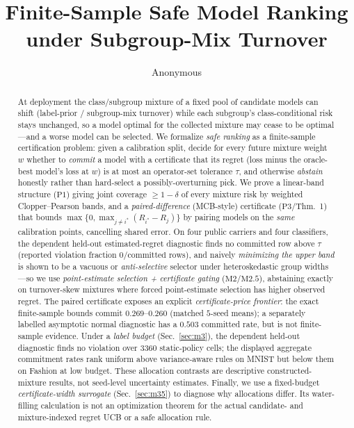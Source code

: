 \documentclass{article}
\title{Finite-Sample Safe Model Ranking under Subgroup-Mix Turnover}
\author{Anonymous}
\date{}
\begin{document}
\maketitle

\begin{abstract}
At deployment the class/subgroup mixture of a fixed pool of candidate models can shift
(label-prior / subgroup-mix turnover) while each subgroup's class-conditional risk stays
unchanged, so a model optimal for the collected mixture may cease to be optimal---and a
worse model can be selected. We formalize \emph{safe ranking} as a finite-sample
certification problem: given a calibration split, decide for every future mixture weight $w$
whether to \emph{commit} a model with a certificate that its regret (loss minus the
oracle-best model's loss at $w$) is at most an operator-set tolerance $\tau$, and otherwise
\emph{abstain} honestly rather than hard-select a possibly-overturning pick. We prove a
linear-band structure ($\mathrm{P1}$) giving joint coverage $\ge1-\delta$ of every mixture
risk by weighted Clopper--Pearson bands, and a \emph{paired-difference} (MCB-style)
certificate ($\mathrm{P3}$/Thm.~1) that bounds $\max\{0,\max_{j\ne i^*}(R_{i^*}-R_j)\}$ by pairing models on the
\emph{same} calibration points, cancelling shared error. On four public carriers and four
classifiers, the dependent held-out estimated-regret diagnostic finds no committed row above
$\tau$ (reported violation fraction $0/\text{committed rows}$), and
naively \emph{minimizing the upper band} is shown to be a vacuous or \emph{anti-selective}
selector under heteroskedastic group widths---so we use \emph{point-estimate selection +
certificate gating} ($\mathrm{M2}$/$\mathrm{M2.5}$), abstaining exactly on turnover-skew
mixtures where forced point-estimate selection has higher observed regret. The paired certificate
exposes an explicit \emph{certificate-price frontier}: the exact finite-sample bounds commit
$0.269$--$0.260$ (matched $5$-seed means); a separately labelled asymptotic normal diagnostic
has a $0.503$ committed rate, but is not finite-sample evidence.
Under a \emph{label budget} (Sec.~\ref{sec:m3}), the dependent held-out diagnostic finds no
violation over 3360 static-policy cells; the displayed aggregate commitment rates rank uniform
above variance-aware rules on MNIST but below them on Fashion at low budget. These allocation
contrasts are descriptive constructed-mixture results,
not seed-level uncertainty estimates. Finally, we use a fixed-budget \emph{certificate-width surrogate}
(Sec.~\ref{sec:m35}) to diagnose why allocations differ. Its water-filling calculation is not
an optimization theorem for the actual candidate- and mixture-indexed regret UCB or a safe
allocation rule.
\end{abstract}
\end{document}

